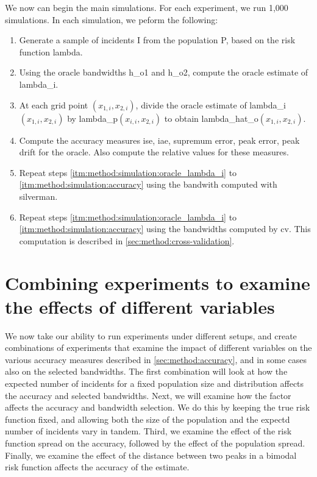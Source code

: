 We now can begin the main simulations.
For each experiment, we run 1,000 simulations.
In each simulation, we peform the following:
\begin{enumerate}
    \item\label{itm:method:simulation:generate} Generate a sample of incidents \gls{I} from the population \gls{P}, based on the risk function \gls{lambda}.
    \item\label{itm:method:simulation:oracle_lambda_i} Using the \gls{oracle} bandwidths \gls{h_o1} and \gls{h_o2}, compute the \gls{oracle} estimate of \gls{lambda_i}.
    \item\label{itm:method:simulation:oracle_lambda_hat} At each grid point \((x_{1,i}, x_{2,i})\), divide the oracle estimate of \gls{lambda_i}\((x_{1,i}, x_{2,i})\) by \gls{lambda_p}\((x_{i,i}, x_{2,i})\) to obtain \gls{lambda_hat_o}\((x_{1,i}, x_{2,i})\).
    \item\label{itm:method:simulation:accuracy} Compute the accuracy measures \gls{ise}, \gls{iae}, \gls{supremum error}, \gls{peak error}, \gls{peak drift} for the \gls{oracle}.
    Also compute the relative values for these measures.
    \item\label{itm:method:simulation:silverman_lambda_i} Repeat steps \ref{itm:method:simulation:oracle_lambda_i} to \ref{itm:method:simulation:accuracy} using the bandwith computed with \gls{silverman}.
    \item\label{itm:method:simulation:cv_lambda_i} Repeat steps \ref{itm:method:simulation:oracle_lambda_i} to \ref{itm:method:simulation:accuracy} using the bandwidths computed by \gls{cv}.
    This computation is described in \cref{sec:method:cross-validation}.
\end{enumerate}

\section[Combining experiments]{Combining experiments to examine the effects of different variables}
\label{sec:method:combining_experiments}

We now take our ability to run experiments under different setups,
and create combinations of experiments that examine the impact of different variables on the various accuracy measures described in \cref{sec:method:accuracy},
and in some cases also on the selected bandwidths.
The first combination will look at how the expected number of incidents for a fixed population size and distribution affects the accuracy and selected bandwidths.
Next, we will examine how the \gls{factor} affects the accuracy and bandwidth selection.
We do this by keeping the true risk function fixed, and allowing both the size of the population and the expectd number of incidents vary in tandem.
Third, we examine the effect of the risk function spread on the accuracy, followed by the effect of the population spread.
Finally, we examine the effect of the distance between two peaks in a bimodal risk function affects the accuracy of the estimate.

